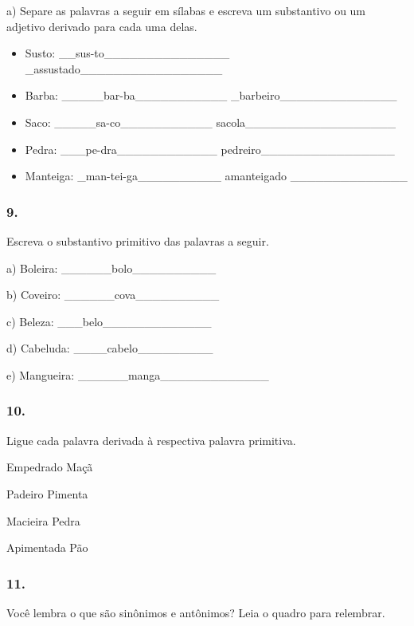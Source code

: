 a) Separe as palavras a seguir em sílabas e escreva um substantivo ou um
adjetivo derivado para cada uma delas.

\begin{itemize}
\item
  Susto: \_\_sus-to\_\_\_\_\_\_\_\_\_\_\_\_\_\_\_
  \_assustado\_\_\_\_\_\_\_\_\_\_\_\_\_\_\_\_\_
\item
  Barba: \_\_\_\_\_bar-ba\_\_\_\_\_\_\_\_\_\_\_
  \_barbeiro\_\_\_\_\_\_\_\_\_\_\_\_\_\_
\item
  Saco: \_\_\_\_\_sa-co\_\_\_\_\_\_\_\_\_\_\_
  sacola\_\_\_\_\_\_\_\_\_\_\_\_\_\_\_\_\_\_
\item
  Pedra: \_\_\_pe-dra\_\_\_\_\_\_\_\_\_\_\_\_
  pedreiro\_\_\_\_\_\_\_\_\_\_\_\_\_\_\_\_
\item
  Manteiga: \_man-tei-ga\_\_\_\_\_\_\_\_\_\_ amanteigado
  \_\_\_\_\_\_\_\_\_\_\_\_\_\_
\end{itemize}

\subsubsection{9. }\label{section-8}

Escreva o substantivo primitivo das palavras a seguir.

a) Boleira: \_\_\_\_\_\_bolo\_\_\_\_\_\_\_\_\_\_

b) Coveiro: \_\_\_\_\_\_cova\_\_\_\_\_\_\_\_\_\_

c) Beleza: \_\_\_belo\_\_\_\_\_\_\_\_\_\_\_\_\_

d) Cabeluda: \_\_\_\_cabelo\_\_\_\_\_\_\_\_\_

e) Mangueira: \_\_\_\_\_\_manga\_\_\_\_\_\_\_\_\_\_\_\_\_

\subsubsection{10. }\label{section-9}

Ligue cada palavra derivada à respectiva palavra primitiva.

Empedrado Maçã

Padeiro Pimenta

Macieira Pedra

Apimentada Pão

\subsubsection{11. }\label{section-10}

Você lembra o que são sinônimos e antônimos? Leia o quadro para
relembrar.

